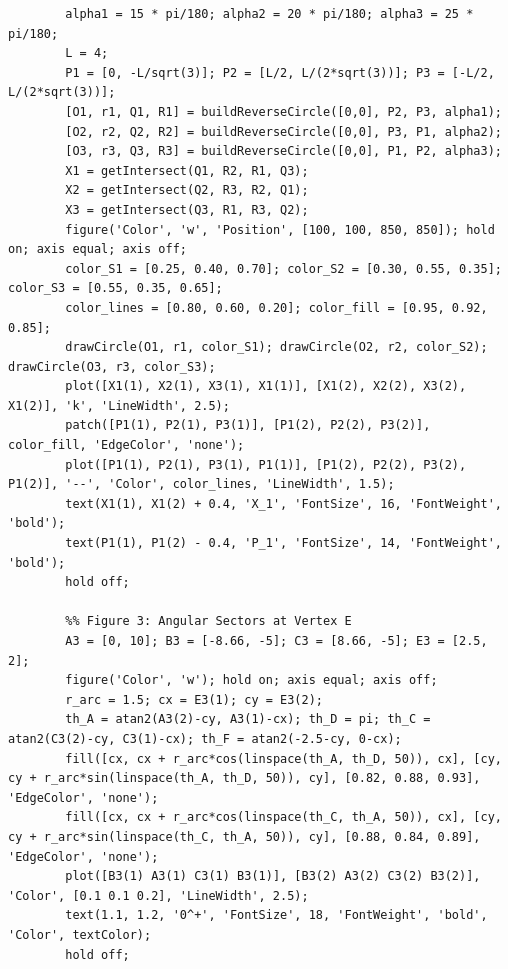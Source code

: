 \documentclass{amsart}
\begin{document}
\begin{lstlisting}[caption={Geometric simulation and plotting script}]
		%% Figure 2: The S-Circle Construction
		alpha1 = 15 * pi/180; alpha2 = 20 * pi/180; alpha3 = 25 * pi/180;
		L = 4;
		P1 = [0, -L/sqrt(3)]; P2 = [L/2, L/(2*sqrt(3))]; P3 = [-L/2, L/(2*sqrt(3))];
		[O1, r1, Q1, R1] = buildReverseCircle([0,0], P2, P3, alpha1);
		[O2, r2, Q2, R2] = buildReverseCircle([0,0], P3, P1, alpha2);
		[O3, r3, Q3, R3] = buildReverseCircle([0,0], P1, P2, alpha3);
		X1 = getIntersect(Q1, R2, R1, Q3);
		X2 = getIntersect(Q2, R3, R2, Q1);
		X3 = getIntersect(Q3, R1, R3, Q2);
		figure('Color', 'w', 'Position', [100, 100, 850, 850]); hold on; axis equal; axis off;
		color_S1 = [0.25, 0.40, 0.70]; color_S2 = [0.30, 0.55, 0.35]; color_S3 = [0.55, 0.35, 0.65]; 
		color_lines = [0.80, 0.60, 0.20]; color_fill = [0.95, 0.92, 0.85];
		drawCircle(O1, r1, color_S1); drawCircle(O2, r2, color_S2); drawCircle(O3, r3, color_S3);
		plot([X1(1), X2(1), X3(1), X1(1)], [X1(2), X2(2), X3(2), X1(2)], 'k', 'LineWidth', 2.5);
		patch([P1(1), P2(1), P3(1)], [P1(2), P2(2), P3(2)], color_fill, 'EdgeColor', 'none');
		plot([P1(1), P2(1), P3(1), P1(1)], [P1(2), P2(2), P3(2), P1(2)], '--', 'Color', color_lines, 'LineWidth', 1.5);
		text(X1(1), X1(2) + 0.4, 'X_1', 'FontSize', 16, 'FontWeight', 'bold');
		text(P1(1), P1(2) - 0.4, 'P_1', 'FontSize', 14, 'FontWeight', 'bold');
		hold off;
		
		%% Figure 3: Angular Sectors at Vertex E
		A3 = [0, 10]; B3 = [-8.66, -5]; C3 = [8.66, -5]; E3 = [2.5, 2];
		figure('Color', 'w'); hold on; axis equal; axis off;
		r_arc = 1.5; cx = E3(1); cy = E3(2);
		th_A = atan2(A3(2)-cy, A3(1)-cx); th_D = pi; th_C = atan2(C3(2)-cy, C3(1)-cx); th_F = atan2(-2.5-cy, 0-cx);
		fill([cx, cx + r_arc*cos(linspace(th_A, th_D, 50)), cx], [cy, cy + r_arc*sin(linspace(th_A, th_D, 50)), cy], [0.82, 0.88, 0.93], 'EdgeColor', 'none');
		fill([cx, cx + r_arc*cos(linspace(th_C, th_A, 50)), cx], [cy, cy + r_arc*sin(linspace(th_C, th_A, 50)), cy], [0.88, 0.84, 0.89], 'EdgeColor', 'none');
		plot([B3(1) A3(1) C3(1) B3(1)], [B3(2) A3(2) C3(2) B3(2)], 'Color', [0.1 0.1 0.2], 'LineWidth', 2.5);
		text(1.1, 1.2, '0^+', 'FontSize', 18, 'FontWeight', 'bold', 'Color', textColor);
		hold off;
		

\end{lstlisting}
\end{document}
